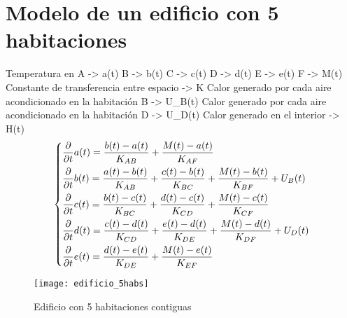 \section{Modelo de un edificio con 5 habitaciones}
Temperatura en A -> a(t)
B -> b(t)
C -> c(t)
D -> d(t)
E -> e(t)
F -> M(t)
Constante de transferencia entre espacio -> K
Calor generado por cada aire acondicionado en la habitación B -> U\_B(t)
Calor generado por cada aire acondicionado en la habitación D -> U\_D(t)
Calor generado en el interior -> H(t)
\begin{equation}\begin{dcases}
	 \dfrac{\partial}{\partial t}a(t)= \dfrac{b(t)-a(t)}{K_{AB}} + \dfrac{M(t) - a(t)}{K_{AF}} \\  \dfrac{\partial}{\partial t}b(t)= \dfrac{a(t)-b(t)}{K_{AB}} + \dfrac{c(t)-b(t)}{K_{BC}} + \dfrac{M(t) - b(t)}{K_{BF}} + U_B(t) \\  \dfrac{\partial}{\partial t}c(t)= \dfrac{b(t)-c(t)}{K_{BC}} + \dfrac{d(t)-c(t)}{K_{CD}} + \dfrac{M(t) - c(t)}{K_{CF}} \\  \dfrac{\partial}{\partial t}d(t)= \dfrac{c(t)-d(t)}{K_{CD}} + \dfrac{e(t)-d(t)}{K_{DE}} + \dfrac{M(t) - d(t)}{K_{DF}} + U_D(t) \\  \dfrac{\partial}{\partial t}e(t)= \dfrac{d(t)-e(t)}{K_{DE}} + \dfrac{M(t) - e(t)}{K_{EF}} \end{dcases}
\end{equation}
\begin{figure}[h!]
	\centering
	\texttt{[image: edificio\_5habs]}
	\caption{Edificio con 5 habitaciones contiguas}
	\label{fig:edif5}
\end{figure}


\endinput
-